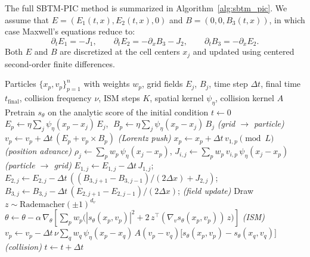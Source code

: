 \documentclass[]{article}
\numberwithin{equation}{section}
\begin{document}
The full SBTM-PIC method is summarized in Algorithm~\ref{alg:sbtm_pic}. We assume that $E = (E_1(t,x), E_2(t,x), 0)$ and $B = (0, 0, B_3(t,x))$, in which case Maxwell's equations reduce to:
\begin{equation}
\label{eq:maxwell_1d}
\partial_t E_1 = -J_1, \qquad \partial_t E_2 = -\partial_x B_3 - J_2, \qquad \partial_t B_3 = -\partial_x E_2.
\end{equation}
Both $E$ and $B$ are discretized at the cell centers $x_j$ and updated using centered second-order finite differences.

\begin{algorithm}[t]
\caption{SBTM-PIC for the Vlasov--Maxwell--Landau system}
\label{alg:sbtm_pic}
\begin{algorithmic}[1]
\REQUIRE Particles $\{x_p, v_p\}_{p=1}^n$ with weights $w_p$, grid fields $E_j$, $B_j$, time step $\Delta t$, final time $t_{\mathrm{final}}$, collision frequency $\nu$, ISM steps $K$, spatial kernel $\psi_\eta$, collision kernel $A$
\STATE Pretrain $s_\theta$ on the analytic score of the initial condition
\STATE $t \leftarrow 0$
  \STATE $E_p \leftarrow \eta\sum_{j}\psi_\eta(x_p{-}x_j)\,E_j$, $\; B_p \leftarrow \eta\sum_{j}\psi_\eta(x_p{-}x_j)\,B_j$ \hfill \textit{(grid $\to$ particle)}
  \STATE $v_p \leftarrow v_p + \Delta t \, (E_p + v_p \times B_p)$ \hfill \textit{(Lorentz push)}
  \STATE $x_p \leftarrow x_p + \Delta t \, v_{1,p} \pmod{L}$ \hfill \textit{(position advance)}
  \STATE $\rho_j \leftarrow \sum_{p} w_p\,\psi_\eta(x_j-x_p)$, \; $J_{i,j} \leftarrow \sum_{p} w_p\,v_{i,p}\,\psi_\eta(x_j{-}x_p)$ \hfill \textit{(particle $\to$ grid)}
  \STATE $E_{1,j} \leftarrow E_{1,j} - \Delta t\, J_{1,j}$;  \; $E_{2,j} \leftarrow E_{2,j} - \Delta t\,\left((B_{3,j+1} - B_{3,j-1})/(2\Delta x) + J_{2,j}\right)$; \\ 
  $B_{3,j} \leftarrow B_{3,j} - \Delta t\,(E_{2,j+1} - E_{2,j-1})/(2\Delta x)$; \hfill \textit{(field update)}
    \STATE Draw $z \sim \mathrm{Rademacher}(\pm 1)^{d_v}$
    \STATE $\theta \leftarrow \theta - \alpha\,\nabla_\theta \!\left[\sum_{p} w_p\big(|s_\theta(x_p,v_p)|^2 + 2\,z^\top (\nabla_v s_\theta(x_p,v_p))\,z\big)\right]$ \hfill \textit{(ISM)}
  \ENDFOR
  \STATE $v_p \leftarrow v_p - \Delta t\,\nu \!\sum_{q} w_q\,\psi_\eta(x_p{-}x_q)\,A(v_p{-}v_q)\big[s_\theta(x_p,v_p) - s_\theta(x_q,v_q)\big]$ \hfill \textit{(collision)}
  \STATE $t \leftarrow t + \Delta t$
\ENDWHILE
\end{algorithmic}
\end{algorithm}
\end{document}
